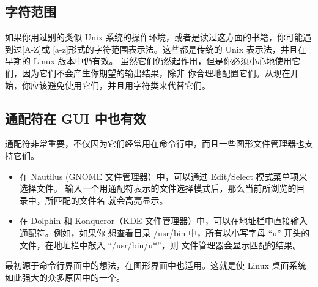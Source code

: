 \fboxrule=6pt \fboxsep=4pt
\begin{colorboxed}[boxcolor=lightgray,bgcolor=white]
\subsection{字符范围}
如果你用过别的类似 Unix 系统的操作环境，或者是读过这方面的书籍，你可能遇到过[A-Z]或 [a-z]形式的字符范围表示法。这些都是传统的 Unix 表示法，并且在早期的 Linux 版本中仍有效。 虽然它们仍然起作用，但是你必须小心地使用它们，因为它们不会产生你期望的输出结果，除非 你合理地配置它们。从现在开始，你应该避免使用它们，并且用字符类来代替它们。

\subsection{通配符在 GUI 中也有效}
通配符非常重要，不仅因为它们经常用在命令行中，而且一些图形文件管理器也支持它们。
\begin{itemize}
	\item 在 Nautilus (GNOME 文件管理器）中，可以通过 Edit/Select 模式菜单项来选择文件。 输入一个用通配符表示的文件选择模式后，那么当前所浏览的目录中，所匹配的文件名 就会高亮显示。
	\item 在 Dolphin 和 Konqueror（KDE 文件管理器）中，可以在地址栏中直接输入通配符。例如，如果你 想查看目录 /usr/bin 中，所有以小写字母 ``u'' 开头的文件，在地址栏中敲入 ``/usr/bin/u*''，则 文件管理器会显示匹配的结果。
\end{itemize}


\par 最初源于命令行界面中的想法，在图形界面中也适用。这就是使 Linux 桌面系统 如此强大的众多原因中的一个。
\end{colorboxed}

